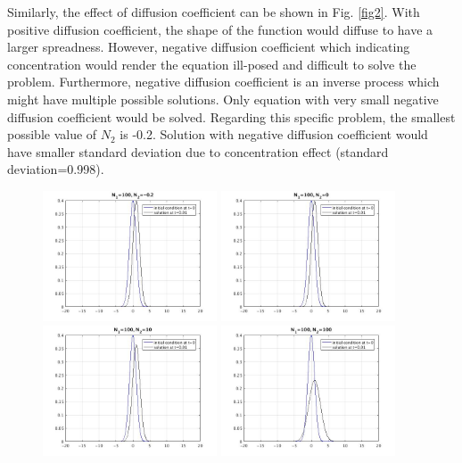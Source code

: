\documentclass[12pt]{article}
\begin{document}
Similarly, the effect of diffusion coefficient can be shown in Fig. \ref{fig2}. 
With positive diffusion coefficient, the shape of the function would diffuse to have a larger spreadness. However, negative diffusion coefficient which indicating concentration would render the equation ill-posed and difficult to solve the problem. Furthermore, negative diffusion coefficient is an inverse process which might have multiple possible solutions. Only equation with very small negative diffusion coefficient would be solved. Regarding this specific problem, the smallest possible value of $N_2$ is -0.2. Solution with negative diffusion coefficient would have smaller standard deviation due to concentration effect (standard deviation=0.998). 

\begin{figure}[H]
\begin{center}

\includegraphics[width=0.46\textwidth]{diffu-02.jpg} 
\includegraphics[width=0.46\textwidth]{diffu0.jpg}  \\
\hspace*{0.2truecm}
\includegraphics[width=0.46\textwidth]{diffu10.jpg}  
\includegraphics[width=0.46\textwidth]{diffu100.jpg}  \\


\end{center}
\end{figure}
\end{document}
